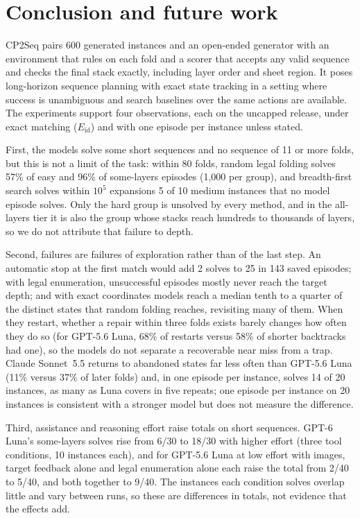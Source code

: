 \section{Conclusion and future work}
\label{sec:conclusion}

CP2Seq pairs 600 generated instances and an open-ended generator with an environment that rules on
each fold and a scorer that accepts any valid sequence and checks the final stack exactly,
including layer order and sheet region. It poses long-horizon sequence planning with exact state
tracking in a setting where success is unambiguous and search baselines over the same actions are
available. The experiments support four observations, each on the uncapped release, under exact
matching ($E_{\mathrm{id}}$) and with one episode per instance unless stated.

First, the models solve some short sequences and no sequence of 11 or more folds, but this is not
a limit of the task: within 80 folds, random legal folding solves 57\% of easy and 96\% of
some-layers episodes (1,000 per group), and breadth-first search solves within $10^5$ expansions
5 of 10 medium instances that no model episode solves. Only the hard group is unsolved by every method, and in the all-layers tier it is
also the group whose stacks reach hundreds to thousands of layers, so we do not attribute that
failure to depth.

Second, failures are failures of exploration rather than of the last step. An automatic stop at
the first match would add 2 solves to 25 in 143 saved episodes; with legal enumeration,
unsuccessful episodes mostly never reach the target depth; and with exact coordinates models reach
a median tenth to a quarter of the distinct states that random folding reaches, revisiting many of them. When they restart,
whether a repair within three folds exists barely changes how often they do so (for GPT-5.6 Luna,
68\% of restarts versus 58\% of shorter backtracks had one), so the models do not separate a
recoverable near miss from a trap. Claude Sonnet~5.5 returns to abandoned states far less often
than GPT-5.6 Luna (11\% versus 37\% of later folds) and, in one episode per instance, solves
14 of 20 instances, as many as Luna covers in five repeats; one episode per instance on 20
instances is consistent with a stronger model but does not measure the difference.

Third, assistance and reasoning effort raise totals on short sequences. GPT-6 Luna's some-layers
solves rise from 6/30 to 18/30 with higher effort (three tool conditions, 10 instances each), and
for GPT-5.6 Luna at low effort with images, target feedback alone and
legal enumeration alone each raise the total from 2/40 to 5/40, and both together to 9/40. The
instances each condition solves overlap little and vary between runs, so these are differences in
totals, not evidence that the effects add.

